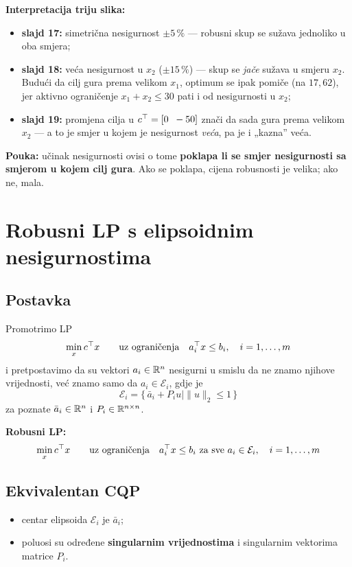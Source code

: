 \textbf{Interpretacija triju slika:}

\begin{itemize}
  \item \textbf{slajd 17:} simetrična nesigurnost $\pm5\,\%$ --- robusni skup se
        sužava jednoliko u oba smjera;
  \item \textbf{slajd 18:} veća nesigurnost u $x_2$ ($\pm15\,\%$) --- skup se
        \emph{jače} sužava u smjeru $x_2$. Budući da cilj gura prema velikom
        $x_1$, optimum se ipak pomiče (na $17{,}62$), jer aktivno ograničenje
        $x_1+x_2 \le 30$ pati i od nesigurnosti u $x_2$;
  \item \textbf{slajd 19:} promjena cilja u $c\T = [0\;\; -50]$ znači da sada
        gura prema velikom $x_2$ --- a to je smjer u kojem je nesigurnost
        \emph{veća}, pa je i „kazna” veća.
\end{itemize}

\textbf{Pouka:} učinak nesigurnosti ovisi o tome \textbf{poklapa li se smjer
nesigurnosti sa smjerom u kojem cilj gura}. Ako se poklapa, cijena robusnosti
je velika; ako ne, mala.

\section{Robusni LP s elipsoidnim nesigurnostima}

\subsection{Postavka}

Promotrimo LP
\[
\min_x c\T x \qquad \uzogr a_i\T x \le b_i, \quad i = 1,\dots,m
\]
i pretpostavimo da su vektori $a_i \in \R^n$ nesigurni u smislu da ne znamo
njihove vrijednosti, već znamo samo da $a_i \in \mathcal{E}_i$, gdje je
\[
\mathcal{E}_i = \{\, \bar a_i + P_iu \mid \|u\|_2 \le 1 \,\}
\]
za poznate $\bar a_i \in \R^n$ i $P_i \in \R^{n\times n}$.

\textbf{Robusni LP:}
\[
\min_x c\T x \qquad \uzogr
a_i\T x \le b_i \text{ za sve } a_i \in \mathcal{E}_i, \quad i = 1,\dots,m
\]

\subsection{Ekvivalentan CQP}

\begin{itemize}
  \item centar elipsoida $\mathcal{E}_i$ je $\bar a_i$;
  \item poluosi su određene \textbf{singularnim vrijednostima} i singularnim
        vektorima matrice $P_i$.
\end{itemize}

